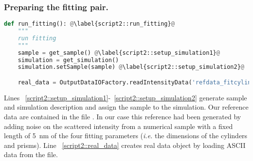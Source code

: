 \subsubsection*{Preparing the fitting pair.}
\begin{lstlisting}[language=python, style=eclipseboxed, firstnumber=45]
def run_fitting(): @\label{script2::run_fitting}@
    """
    run fitting
    """
    sample = get_sample() @\label{script2::setup_simulation1}@
    simulation = get_simulation()
    simulation.setSample(sample) @\label{script2::setup_simulation2}@

    real_data = OutputDataIOFactory.readIntensityData('refdata_fitcylinderprisms.txt') @\label{script2::real_data}@
\end{lstlisting}
Lines ~\ref{script2::setup_simulation1}-~\ref{script2::setup_simulation2} generate
sample and simulation description and assign the sample to the simulation.
Our reference data are contained in the file .
 In our case this reference had been generated by adding noise
on the scattered intensity from a numerical sample with a fixed length of 5~nm of the four fitting
parameters (\textit{i.e.} the dimensions of the cylinders and prisms).
Line ~\ref{script2::real_data} creates real data object by loading ASCII data from the file.


